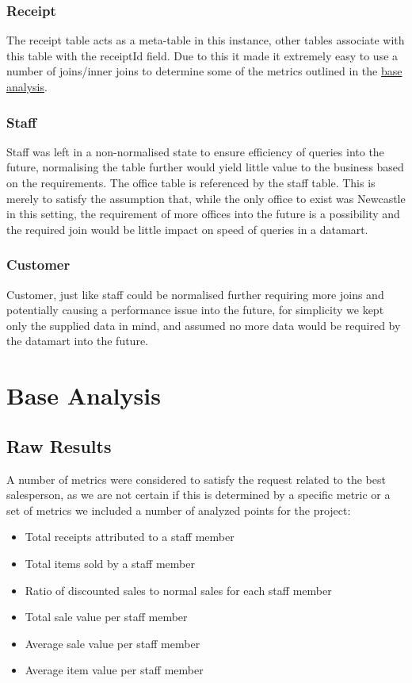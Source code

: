 \documentclass{article}
\begin{document}
            \subsubsection{Receipt}
                The receipt table acts as a meta-table in this instance, other tables associate with 
                this table with the receiptId field. Due to this it made it extremely easy to use a number
                of joins/inner joins to determine some of the metrics outlined in the \hyperref[sec:BA]{base analysis}.
            \subsubsection{Staff}
                Staff was left in a non-normalised state to ensure efficiency of queries into the future, 
                normalising the table further would yield little value to the business based on the requirements.
                The office table is referenced by the staff table. This is merely to satisfy the assumption
                that, while the only office to exist was Newcastle in this setting, the requirement of more 
                offices into the future is a possibility and the required join would be little impact on speed
                of queries in a datamart.
            \subsubsection{Customer}
                Customer, just like staff could be normalised further requiring more joins and potentially 
                causing a performance issue into the future, for simplicity we kept only the supplied
                data in mind, and assumed no more data would be required by the datamart into the future.

    \section{Base Analysis}
    \label{sec:BA}
        \subsection{Raw Results}
            A number of metrics were considered to satisfy the request related to the best salesperson,
            as we are not certain if this is determined by a specific metric or a set of metrics we 
            included a number of analyzed points for the project:
            \begin{itemize}
                \item Total receipts attributed to a staff member
                \item Total items sold by a staff member
                \item Ratio of discounted sales to normal sales for each staff member
                \item Total sale value per staff member
                \item Average sale value per staff member
                \item Average item value per staff member
            \end{itemize}
\end{document}
